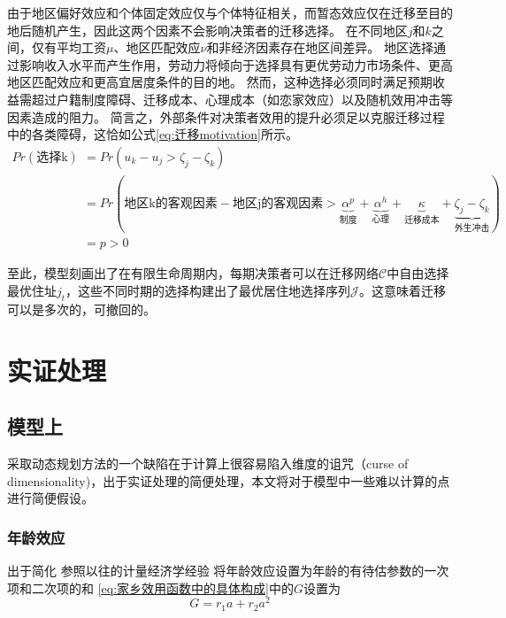 \documentclass[a4paper,12pt,oneside]{book} %
\begin{document}
由于地区偏好效应和个体固定效应仅与个体特征相关，而暂态效应仅在迁移至目的地后随机产生，因此这两个因素不会影响决策者的迁移选择。
在不同地区$j$和$k$之间，仅有平均工资$\mu$、地区匹配效应$\nu$和非经济因素存在地区间差异。
地区选择通过影响收入水平而产生作用，劳动力将倾向于选择具有更优劳动力市场条件、更高地区匹配效应和更高宜居度条件的目的地。
然而，这种选择必须同时满足预期收益需超过户籍制度障碍、迁移成本、心理成本（如恋家效应）以及随机效用冲击等因素造成的阻力。
简言之，外部条件对决策者效用的提升必须足以克服迁移过程中的各类障碍，这恰如公式\ref{eq:迁移motivation}所示。
\begin{equation}
\begin{split}
  Pr(\text{选择k})&= Pr(u_k - u_j > \zeta_j - \zeta_k) 
  \\&= Pr(
  \text{地区k的客观因素} - \text{地区j的客观因素} 
  > 
  \underbrace{\alpha^p}_{\text{制度}} + \underbrace{\alpha^h}_{\text{心理}} + \underbrace{\kappa}_{\text{迁移成本}} + \underbrace{
  \zeta_j - \zeta_k}_{\text{外生冲击}} 
  )
  \\&= p >0
\end{split}
\label{eq:迁移motivation}
\end{equation}

至此，模型刻画出了在有限生命周期内，每期决策者可以在迁移网络$\mathcal{C}$中自由选择最优住址$j_t$，这些不同时期的选择构建出了最优居住地选择序列$\mathcal{J}$。这意味着迁移可以是多次的，可撤回的。




\chapter{实证处理}

\section{模型上} 

采取动态规划方法的一个缺陷在于计算上很容易陷入维度的诅咒（curse of dimensionality)，出于实证处理的简便处理，本文将对于模型中一些难以计算的点进行简便假设。

\subsection{年龄效应}
出于简化
参照以往的计量经济学经验
将年龄效应设置为年龄的有待估参数的一次项和二次项的和
\ref{eq:家乡效用函数中的具体构成}中的$G$设置为
$$G=r_1 a + r_2 a^2$$
\end{document}

